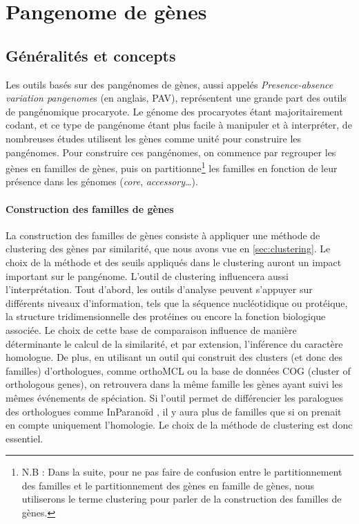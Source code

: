 \newpage
\section{Pangenome de gènes}

\subsection{Généralités et concepts}

Les outils basés sur des pangénomes de gènes, aussi appelés \textit{Presence-absence variation pangenome}s (en anglais, PAV), représentent une grande part des outils de pangénomique procaryote. Le génome des procaryotes étant majoritairement codant, et ce type de pangénome étant plus facile à manipuler et à interpréter, de nombreuses études utilisent les gènes comme unité pour construire les pangénomes. Pour construire ces pangénomes, on commence par regrouper les gènes en familles de gènes, puis on partitionne\footnote{N.B : Dans la suite, pour ne pas faire de confusion entre le partitionnement des familles et le partitionnement des gènes en famille de gènes, nous utiliserons le terme clustering pour parler de la construction des familles de gènes.} les familles en fonction de leur présence dans les génomes (\textit{core}, \textit{accessory}\dots).

\paragraph{Construction des familles de gènes}

La construction des familles de gènes consiste à appliquer une méthode de clustering des gènes par similarité, que nous avons vue en \autoref{sec:clustering}. Le choix de la méthode et des seuils appliqués dans le clustering auront un impact important sur le pangénome. L'outil de clustering influencera aussi l'interprétation. Tout d’abord, les outils d’analyse peuvent s’appuyer sur différents niveaux d’information, tels que la séquence nucléotidique ou protéique, la structure tridimensionnelle des protéines ou encore la fonction biologique associée. Le choix de cette base de comparaison influence de manière déterminante le calcul de la similarité, et par extension, l’inférence du caractère homologue. De plus, en utilisant un outil qui construit des clusters (et donc des familles) d'orthologues, comme orthoMCL \cite{li_orthomcl_2003} ou la base de données COG (cluster of orthologous genes), on retrouvera dans la même famille les gènes ayant suivi les mêmes événements de spéciation. Si l'outil permet de différencier les paralogues des orthologues comme InParanoïd \cite{remm_automatic_2001}, il y aura plus de familles que si on prenait en compte uniquement l'homologie. Le choix de la méthode de clustering est donc essentiel.

